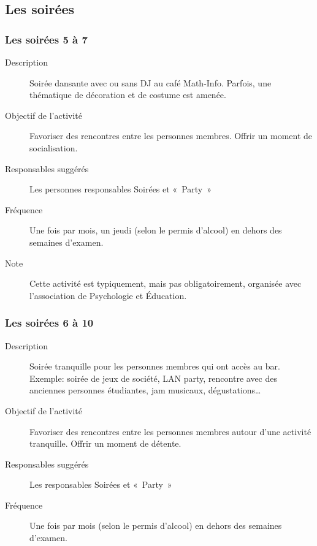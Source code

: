 \documentclass{aediroum}
\begin{document}
\subsection{Les soirées}\label{sec:soirees}
\subsubsection{Les soirées 5 à 7}\label{sec:5-a-7}
\begin{description}
	\item[Description] Soirée dansante avec ou sans DJ au café Math-Info. Parfois, une thématique de décoration et de costume est amenée.
	\item[Objectif de l'activité] Favoriser des rencontres entre les personnes membres. Offrir un moment de socialisation.
	\item[Responsables suggérés] Les personnes responsables Soirées et «~Party~»
	\item[Fréquence] Une fois par mois, un jeudi (selon le permis d'alcool) en dehors des semaines d'examen.
	\item[Note] Cette activité est typiquement, mais pas obligatoirement, organisée avec l'association de Psychologie et Éducation.
\end{description}

\subsubsection{Les soirées 6 à 10}\label{sec:6-a-10}
\begin{description}
	\item[Description] Soirée tranquille pour les personnes membres qui ont accès au bar. Exemple: soirée de jeux de société, LAN party, rencontre avec des anciennes personnes étudiantes, jam musicaux, dégustations\ldots{}
	\item[Objectif de l'activité] Favoriser des rencontres entre les personnes membres autour d'une activité tranquille. Offrir un moment de détente.
	\item[Responsables suggérés] Les responsables Soirées et «~Party~»
	\item[Fréquence] Une fois par mois (selon le permis d'alcool) en dehors des semaines d'examen.
\end{description}
\end{document}
